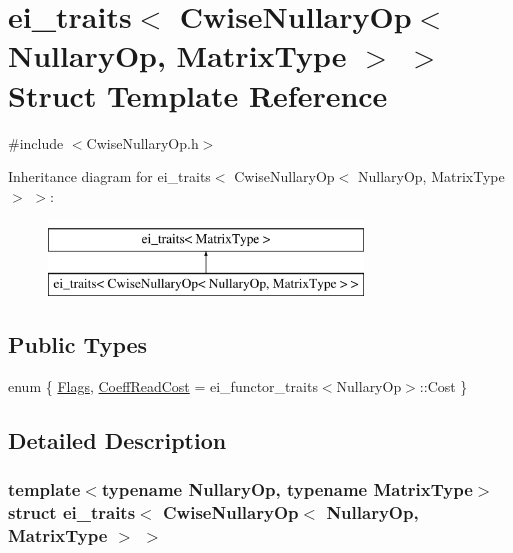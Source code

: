 \hypertarget{structei__traits_3_01_cwise_nullary_op_3_01_nullary_op_00_01_matrix_type_01_4_01_4}{\section{ei\-\_\-traits$<$ Cwise\-Nullary\-Op$<$ Nullary\-Op, Matrix\-Type $>$ $>$ Struct Template Reference}
\label{structei__traits_3_01_cwise_nullary_op_3_01_nullary_op_00_01_matrix_type_01_4_01_4}
}


{\ttfamily \#include $<$Cwise\-Nullary\-Op.\-h$>$}

Inheritance diagram for ei\-\_\-traits$<$ Cwise\-Nullary\-Op$<$ Nullary\-Op, Matrix\-Type $>$ $>$\-:\begin{figure}[H]
\begin{center}
\leavevmode
\includegraphics[height=2.000000cm]{structei__traits_3_01_cwise_nullary_op_3_01_nullary_op_00_01_matrix_type_01_4_01_4}
\end{center}
\end{figure}
\subsection*{Public Types}
\begin{DoxyCompactItemize}
\item 
enum \{ \hyperlink{structei__traits_3_01_cwise_nullary_op_3_01_nullary_op_00_01_matrix_type_01_4_01_4_a20518924df9312b03eff03a565406651af7e7c5514c0e2f59e64345a3e6cc0a21}{Flags}, 
\hyperlink{structei__traits_3_01_cwise_nullary_op_3_01_nullary_op_00_01_matrix_type_01_4_01_4_a20518924df9312b03eff03a565406651a66bda3a0427cd1c346364b16cc76d73f}{Coeff\-Read\-Cost} = ei\-\_\-functor\-\_\-traits$<$Nullary\-Op$>$\-:\-:Cost
 \}
\end{DoxyCompactItemize}


\subsection{Detailed Description}
\subsubsection*{template$<$typename Nullary\-Op, typename Matrix\-Type$>$struct ei\-\_\-traits$<$ Cwise\-Nullary\-Op$<$ Nullary\-Op, Matrix\-Type $>$ $>$}




